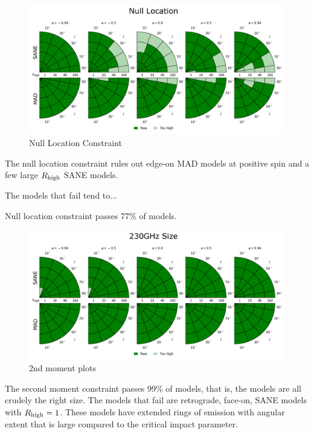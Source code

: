 \begin{figure}
  \centering
  \includegraphics[width=\columnwidth]{./figures/Null_loc_Constraints.png}
  \caption{Null Location Constraint}
  \label{fig:cmp_ozel}
\end{figure}

The null location constraint rules out edge-on MAD models at positive spin and a few large $R_\mathrm{high}$ SANE models.

The models that fail tend to...

Null location constraint passes 77\% of models.


\begin{figure}
  \centering
  \includegraphics[width=\columnwidth]{./figures/230GHz_size_Constraints.png}
  \caption{2nd moment plots}
  \label{fig:cmp_2nd_moment}
\end{figure}

The second moment constraint passes 99\% of models, that is, the models are all crudely the right size.  The models that fail are retrograde, face-on, SANE models with $R_\mathrm{high} = 1$. These models have extended rings of emission with angular extent that is large compared to the critical impact parameter.

